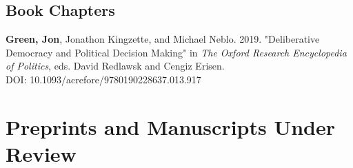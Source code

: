 \documentclass[letterpaper]{article}
\renewenvironment{itemize}{
  \begin{list}{}{
    \setlength{\leftmargin}{1.5em}
  }
}{
  \end{list}
}
\begin{document}
\subsection*{Book Chapters}

\begin{etaremune}
\item \textbf{Green, Jon}, Jonathon Kingzette, and Michael Neblo. 2019. "Deliberative Democracy and Political Decision Making" in \textit{The Oxford Research Encyclopedia of Politics}, eds. David Redlawsk and Cengiz Erisen.\\
DOI: 10.1093/acrefore/9780190228637.013.917
\end{etaremune}

\section*{Preprints and Manuscripts Under Review}



\end{document}
